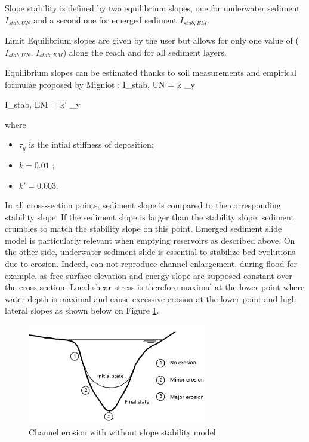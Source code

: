 Slope stability is defined by two equilibrium slopes, one for underwater sediment $I_{stab, UN}$ and a second one for emerged sediment $I_{stab, EM}$.

\begin{CommentBlock}{Limit}
	Equilibrium slopes are given by the user but \courlis allows for only one value of ($I_{stab, UN}$, $I_{stab, EM}$) along the reach and for all sediment layers.
\end{CommentBlock}

Equilibrium slopes can be estimated thanks to soil measurements and empirical formulae proposed by Migniot \cite{Mig89} :
\bequ
	\tan I_{stab, UN} = k \tau_y
	\label{eq:stabUN}
\eequ

\bequ
	\tan I_{stab, EM} = k' \tau_y
	\label{eq:stabEM}
\eequ

where
\begin{itemize}
	\item $\tau_y$ is the intial stiffness of deposition;
	\item $k=0.01$ ;
	\item $k'=0.003$.
\end{itemize}

In all cross-section points, sediment slope is compared to the corresponding stability slope. If the sediment slope is larger than the stability slope, sediment crumbles to match the stability slope on this point.
Emerged sediment slide model is particularly relevant when emptying reservoirs as described above. On the other side, underwater sediment slide is essential to stabilize bed evolutions due to erosion. Indeed, \courlis can not reproduce channel enlargement, during flood for example, as free surface elevation and energy slope are supposed constant over the cross-section. Local shear stress is therefore maximal at the lower point where water depth is maximal and cause excessive erosion at the lower point and high lateral slopes as shown below on Figure \ref{fig:no_stab_model}. 

\begin{figure}[htb!]
	\centering
	\includegraphics[width=0.7\textwidth]{./graphics/chenal.png}
	\caption{Channel erosion with \courlis without slope stability model}
	\label{fig:no_stab_model}
\end{figure}

